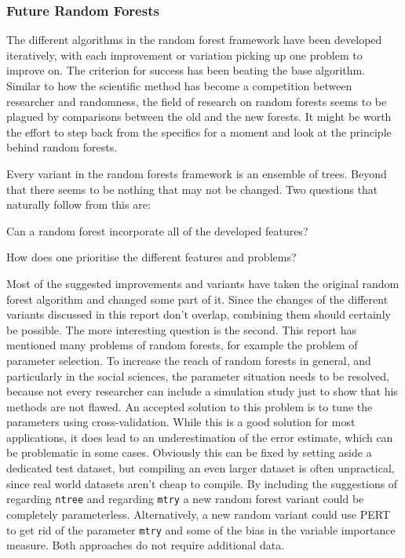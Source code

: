 \documentclass[a4paper,man,12pt,apacite,floatsintext,draftfirst]{apa6} %
\begin{document}
\subsubsection{Future Random Forests}
The different algorithms in the random forest framework have been developed
iteratively, with each improvement or variation picking up one problem to
improve on.
The criterion for success has been beating the base algorithm.
Similar to how the scientific method has become a competition between
researcher and randomness, the field of research on random forests seems
to be plagued by comparisons between the old and the new forests.
It might be worth the effort to step back from the specifics for a moment
and look at the principle behind random forests.

Every variant in the random forests framework is an ensemble of trees.
Beyond that there seems to be nothing that may not be changed.
Two questions that naturally follow from this are:

\begin{APAenumerate}
\item Can a random forest incorporate all of the developed features?
\item How does one prioritise the different features and problems?
\end{APAenumerate}

Most of the suggested improvements and variants have taken the original
random forest algorithm and changed some part of it. Since the changes of
the different variants discussed in this report don't overlap, combining
them should certainly be possible.
The more interesting question is the second.
This report has mentioned many problems of random forests, for example the
problem of parameter selection.
To increase the reach of random forests in general, and particularly in
the social sciences, the parameter situation needs to be resolved, because
not every researcher can include a simulation study just to show that his
methods are not flawed.
An accepted solution to this problem is to tune the parameters using cross-validation.
While this is a good solution for most applications, it does lead to an
underestimation of the error estimate, which can be problematic in some cases.
Obviously this can be fixed by setting aside a dedicated test dataset, but
compiling an even larger dataset is often unpractical, since real world datasets
aren't cheap to compile.
By including the suggestions of  regarding
\texttt{ntree} and  regarding \texttt{mtry}
a new random forest variant could be completely parameterless.
Alternatively, a new random variant could use PERT to get rid of the
parameter \texttt{mtry} and some of the bias in the variable importance
measure.
Both approaches do not require additional data.
\end{document}
